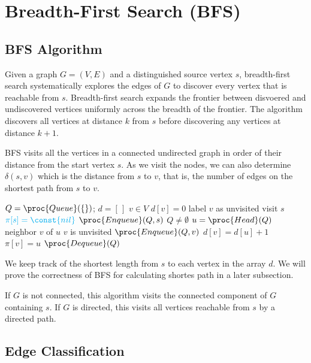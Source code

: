 \section{Breadth-First Search (BFS)} 

\subsection{BFS Algorithm}
Given a graph $G=(V,E)$ and a distinguished source vertex $s$, breadth-first search systematically explores the edges of $G$ to discover every vertex that is reachable from $s$. Breadth-first search expands the frontier between disvoered and undiscovered vertices uniformly across the breadth of the frontier. The algorithm discovers all vertices at distance $k$ from $s$ before discovering any vertices at distance $k+1$.

BFS visits all the vertices in a connected undirected graph in order of their distance from the start vertex $s$. As we visit the nodes, we can also determine $\delta(s,v)$ which is the distance from $s$ to $v$, that is, the number of edges on the shortest path from $s$ to $v$.

\begin{codebox}
    \li $Q = \proc{Queue}(\{\})$;\; $d = [ \, ]$ 
    \li \For $v \in V$ \Do
        \li $d[v] = 0$ 
        \li label $v$ as unvisited \End
    \li visit $s$
    \li $\color{cyan} \pi[s] = \const{nil}$ 
    \li $\proc{Enqueue}(Q,s)$
    \li \While $Q \neq \emptyset$ \Do
        \li $u = \proc{Head}(Q)$
        \li {} neighbor $v$ of $u$ \Do
            \li \If $v$ is unvisited \Then
                \li $\proc{Enqueue}(Q,v)$
                \li $d[v] = d[u] + 1$
                \li \color{cyan} $\pi[v] = u$  \End
            \End
        \li $\proc{Dequeue}(Q)$
\end{codebox}

We keep track of the shortest length from $s$ to each vertex in the array $d$. We will prove the correctness of BFS for calculating shortes path in a later subsection.

If $G$ is not connected, this algorithm visits the connected component of $G$ containing $s$. If $G$ is directed, this visits all vertices reachable from $s$ by a directed path.

\subsection{Edge Classification}

